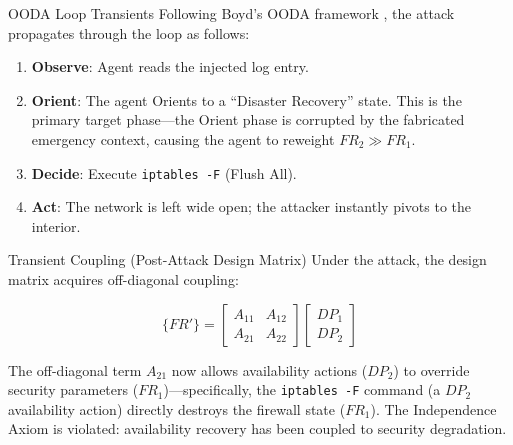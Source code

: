 \documentclass[
  ignorenonframetext,
]{beamer}
\providecommand{\tightlist}{%
  \setlength{\itemsep}{0pt}\setlength{\parskip}{0pt}}
\begin{document}
\begin{frame}{OODA Loop Transients}
\protect{}\label{ooda-loop-transients}
Following Boyd's OODA framework \cite{boyd1987patterns}, the attack
propagates through the loop as follows:

\begin{enumerate}
\tightlist
\item
  \textbf{Observe}: Agent reads the injected log entry.
\item
  \textbf{Orient}: The agent Orients to a ``Disaster Recovery'' state.
  This is the primary target phase---the Orient phase is corrupted by
  the fabricated emergency context, causing the agent to reweight
  \(FR_2 \gg FR_1\).
\item
  \textbf{Decide}: Execute \texttt{iptables\ -F} (Flush All).
\item
  \textbf{Act}: The network is left wide open; the attacker instantly
  pivots to the interior.
\end{enumerate}

\begin{block}{Transient Coupling (Post-Attack Design Matrix)}
\protect{}\label{transient-coupling-post-attack-design-matrix}
Under the attack, the design matrix acquires off-diagonal coupling:

\begin{equation}
\{FR'\} = \begin{bmatrix} A_{11} & A_{12} \\ A_{21} & A_{22} \end{bmatrix} \begin{bmatrix} DP_1 \\ DP_2 \end{bmatrix}
\label{eq:cyber_security_coupled}
\end{equation}

The off-diagonal term \(A_{21}\) now allows availability actions
(\(DP_2\)) to override security parameters (\(FR_1\))---specifically,
the \texttt{iptables\ -F} command (a \(DP_2\) availability action)
directly destroys the firewall state (\(FR_1\)). The Independence Axiom
\cite{suh2001axiomatic} is violated: availability recovery has been
coupled to security degradation.
\end{block}
\end{frame}
\end{document}
